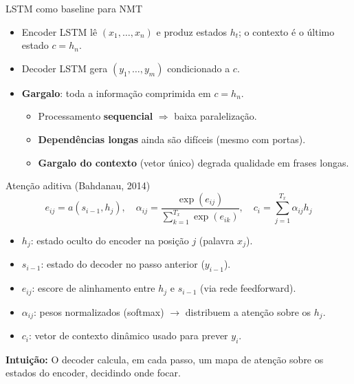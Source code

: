 \documentclass{beamer}
\begin{document}
\begin{frame}{LSTM como baseline para NMT}
	\begin{itemize}
		\item Encoder LSTM lê $(x_1,\dots,x_n)$ e produz estados $h_t$; o contexto é o último estado $c=h_n$.
		\item Decoder LSTM gera $(y_1,\dots,y_m)$ condicionado a $c$.
	\end{itemize}
	\begin{itemize}
		\item \textbf{Gargalo}: toda a informação comprimida em $c=h_n$.
		\begin{itemize}
			\item Processamento \textbf{sequencial} $\Rightarrow$ baixa paralelização.
			\item \textbf{Dependências longas} ainda são difíceis (mesmo com portas).
			\item \textbf{Gargalo do contexto} (vetor único) degrada qualidade em frases longas.
		\end{itemize}
	\end{itemize}
\end{frame}

\begin{frame}{Atenção aditiva (Bahdanau, 2014)}
\[
e_{ij} = a(s_{i-1}, h_j), \quad
\alpha_{ij} = \frac{\exp(e_{ij})}{\sum_{k=1}^{T_x} \exp(e_{ik})}, \quad
c_i = \sum_{j=1}^{T_x} \alpha_{ij} h_j
\]

\begin{itemize}
  \item $h_j$: estado oculto do encoder na posição $j$ (palavra $x_j$).
  \item $s_{i-1}$: estado do decoder no passo anterior ($y_{i-1}$).
  \item $e_{ij}$: escore de alinhamento entre $h_j$ e $s_{i-1}$ (via rede feedforward).
  \item $\alpha_{ij}$: pesos normalizados (softmax) $\to$ distribuem a atenção sobre os $h_j$.
  \item $c_i$: vetor de contexto dinâmico usado para prever $y_i$.
\end{itemize}

\textbf{Intuição:} O decoder calcula, em cada passo, um mapa de atenção sobre os estados do encoder, decidindo onde focar.
\end{frame}
\end{document}
